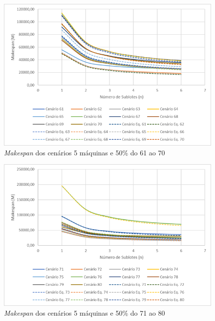 \begin{figure}[H]
    \centering
    \includegraphics[width=13cm]{Apendices/Figuras/05m50_61-70.png}
    \caption{\textit{Makespan} dos cenários 5 máquinas e 50\% do 61 ao 70}
    \label{fig:05m50_61-70}
\end{figure}

\begin{figure}[H]
    \centering
    \includegraphics[width=13cm]{Apendices/Figuras/05m50_71-80.png}
    \caption{\textit{Makespan} dos cenários 5 máquinas e 50\% do 71 ao 80}
    \label{fig:05m50_71-80}
\end{figure}

